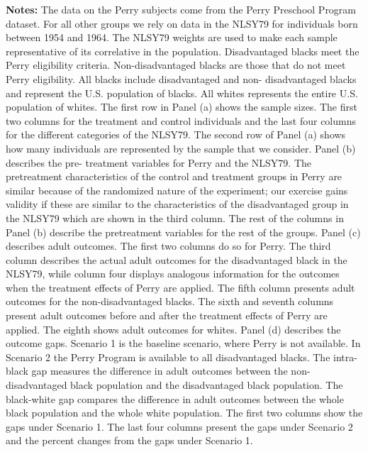 \begin{table}[htbp]
{{ {\bfseries Notes:} The data on the Perry  subjects come from the Perry Preschool Program dataset. For all other  groups we rely on data in the NLSY79 for individuals born between 1954 and 1964.   The NLSY79 weights are used to make each sample representative  of its correlative in the population. Disadvantaged blacks meet the  Perry eligibility criteria. Non-disadvantaged blacks are those that do  not meet Perry eligibility. All blacks include disadvantaged and non- disadvantaged blacks and represent the U.S. population of blacks. All  whites represents the entire U.S. population of whites. The first row in  Panel (a) shows the sample sizes. The first two columns for the treatment  and control individuals and the last four columns for the different categories  of the NLSY79. The second row of Panel (a) shows how many individuals are  represented by the sample that we consider. Panel (b) describes the pre-  treatment variables for Perry and the NLSY79. The pretreatment characteristics  of the control and treatment groups in Perry are similar because of the  randomized nature of the experiment; our exercise gains validity if these  are similar to the characteristics of the disadvantaged group in the NLSY79  which are shown in the third column. The rest of the columns in Panel (b)  describe the pretreatment variables for the rest of the groups. Panel (c)  describes adult outcomes. The first two columns do so for Perry. The third column  describes the actual adult outcomes for the disadvantaged black in the NLSY79,  while column four displays analogous information for the outcomes when the  treatment effects of Perry are applied. The fifth column presents adult outcomes  for the non-disadvantaged blacks. The sixth and seventh columns present adult outcomes before  and after the treatment effects of Perry are applied. The  eighth shows adult outcomes for whites. Panel (d) describes the outcome gaps.  Scenario 1 is the baseline scenario, where Perry is not available. In Scenario 2  the Perry Program is available to all disadvantaged blacks. The intra- black gap measures the difference in adult outcomes between the non- disadvantaged black population and the disadvantaged black population.  The black-white gap compares the difference in adult outcomes between the  whole black population and the whole white population. The first two columns  show the gaps under Scenario 1. The last four columns present the gaps under  Scenario 2 and the percent changes from the gaps under Scenario 1. } } 
 \end{table}
